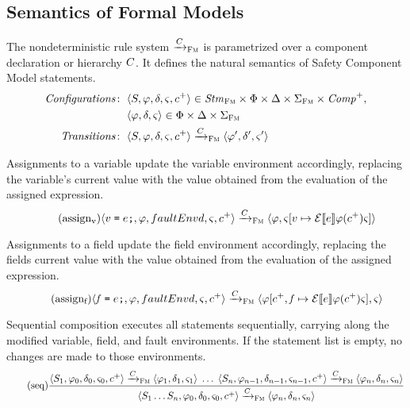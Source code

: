 \documentclass[a4paper,10pt,english]{article}
\begin{document}
\subsection{Semantics of Formal Models}
The nondeterministic rule system $\xrightarrow{C}_\textsc{Fm}$ is parametrized over a component declaration or hierarchy $C$. It defines
the natural semantics of Safety Component Model statements.
\begin{align*}
	\mathit{Configurations} \colon & \;\langle S, \varphi, \delta, \varsigma, c^+ \rangle \in \mathit{Stm}_\textsc{Fm}
	\times \Phi \times \Delta \times \Sigma_\textsc{Fm} \times \mathit{Comp}^+,
	\\
	& \; \langle \varphi, \delta, \varsigma \rangle \in \Phi \times \Delta \times \Sigma_\textsc{Fm}
	\\
	\mathit{Transitions} \colon & \;\langle S, \varphi, \delta, \varsigma, c^+ \rangle \xrightarrow{C}_\textsc{Fm}
	\langle \varphi', \delta', \varsigma' \rangle
\end{align*}

Assignments to a variable update the variable environment accordingly, replacing the variable's current value with the value
obtained from the evaluation of the assigned expression.
\begin{equation*}
	\tag{assign${}_\text{v}$}
	\configurationFm{\assignVarStm{\var}{\expr}, \fieldEnv, faultEnvd, \varEnvFm, \toListNE{\comp}}
		\stmArrowFm
	\configurationFm{\fieldEnv, \varEnvFm[\var \mapsto \ExprSem{\expr} \fieldEnv(\toListNE{\comp}) \varEnvFm]}
\end{equation*}

Assignments to a field update the field environment accordingly, replacing the fields current value with the value
obtained from the evaluation of the assigned expression.
\begin{equation*}
	\tag{assign${}_\text{f}$}
	\configurationFm{\assignVarStm{\field}{\expr}, \fieldEnv, faultEnvd, \varEnvFm, \toListNE{\comp}}
		\stmArrowFm
	\configurationFm{\fieldEnv[\toListNE{\comp}, \field \mapsto \ExprSem{\expr} \fieldEnv(\toListNE{\comp}) \varEnvFm], \varEnvFm}
\end{equation*}

Sequential composition executes all statements sequentially, carrying along the modified variable, field, and fault environments.
If the statement list is empty, no changes are made to those environments.
\begin{equation*}
	\tag{seq}
	\dfrac
	{
		\langle S_1, \varphi_0, \delta_0, \varsigma_0, c^+ \rangle
			\xrightarrow{C}_\textsc{Fm}
		\langle \varphi_1, \delta_1, \varsigma_1 \rangle
		\;
		\ldots
		\;
		\langle S_n, \varphi_{n-1}, \delta_{n-1}, \varsigma_{n-1}, c^+ \rangle
			\xrightarrow{C}_\textsc{Fm}
		\langle \varphi_n, \delta_n, \varsigma_n \rangle
	}
	{
		\langle S_1 \ldots S_n, \varphi_0, \delta_0, \varsigma_0, c^+ \rangle
			\xrightarrow{C}_\textsc{Fm}
		\langle \varphi_n, \delta_n, \varsigma_n \rangle
	}
\end{equation*}
\end{document}
